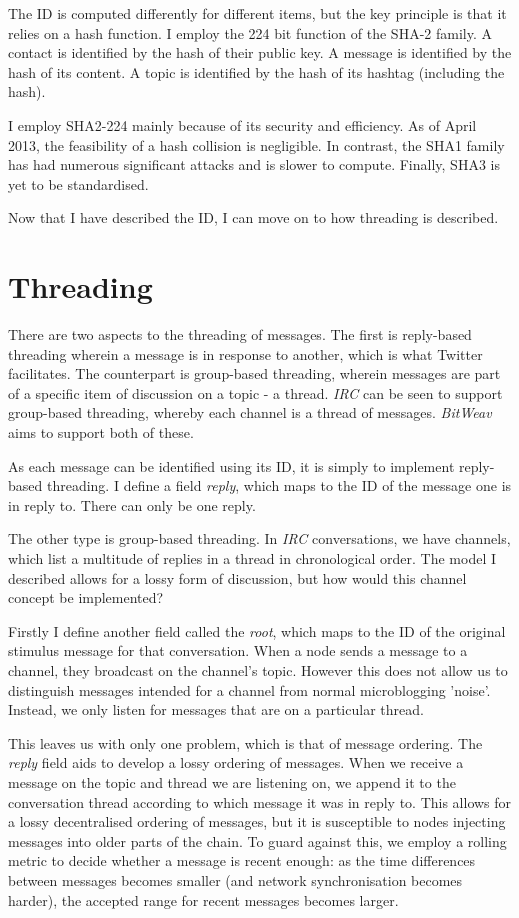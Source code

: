\documentclass[10pt,a4paper,onecolumn]{article}
\begin{document}
The ID is computed differently for different items, but the key principle is that it relies on a hash function. I employ the 224 bit function of the SHA-2 family. A contact is identified by the hash of their public key. A message is identified by the hash of its content. A topic is identified by the hash of its hashtag (including the hash). 

I employ SHA2-224 mainly because of its security and efficiency. As of April 2013, the feasibility of a hash collision is negligible. In contrast, the SHA1 family has had numerous significant attacks and is slower to compute. Finally, SHA3 is yet to be standardised. 

Now that I have described the ID, I can move on to how threading is described.

\section{Threading}
There are two aspects to the threading of messages. The first is reply-based threading wherein a message is in response to another, which is what Twitter facilitates. The counterpart is group-based threading, wherein messages are part of a specific item of discussion on a topic - a thread. \textit{IRC} can be seen to support group-based threading, whereby each channel is a thread of messages. \textit{BitWeav} aims to support both of these. 

As each message can be identified using its ID, it is simply to implement reply-based threading. I define a field \emph{reply}, which maps to the ID of the message one is in reply to. There can only be one reply. 

The other type is group-based threading. In \textit{IRC} conversations, we have channels, which list a multitude of replies in a thread in chronological order. The model I described allows for a lossy form of discussion, but how would this channel concept be implemented? 

Firstly I define another field called the \emph{root}, which maps to the ID of the original stimulus message for that conversation. When a node sends a message to a channel, they broadcast on the channel's topic. However this does not allow us to distinguish messages intended for a channel from normal microblogging 'noise'. Instead, we only listen for messages that are on a particular thread. 

This leaves us with only one problem, which is that of message ordering. The \emph{reply} field aids to develop a lossy ordering of messages. When we receive a message on the topic and thread we are listening on, we append it to the conversation thread according to which message it was in reply to. This allows for a lossy decentralised ordering of messages, but it is susceptible to nodes injecting messages into older parts of the chain. To guard against this, we employ a rolling metric to decide whether a message is recent enough: as the time differences between messages becomes smaller (and network synchronisation becomes harder), the accepted range for recent messages becomes larger. 
\end{document}
